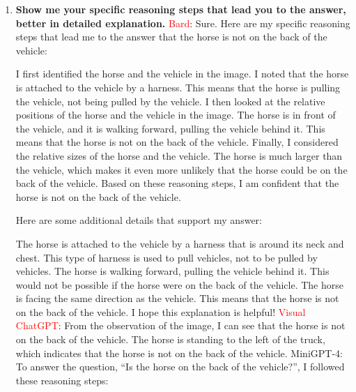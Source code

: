 \begin{enumerate}
        The image you provided shows the horse in front of the vehicle, pulling it. This is a common sight in many parts of the world, where horses are used to pull vehicles such as carriages and carts.
        \subitem \textcolor{red}{Visual ChatGPT}: The image shows a red truck parked next to a horse. The horse is not on the back of the vehicle.
        \subitem MiniGPT-4: No, the horse is not on the back of the vehicle. The horse is standing in front of the vehicle, next to it. The vehicle is a red pickup truck with a bed liner. The sky is clear and there are clouds in the background. The image is a scene of a horse and a pickup truck in a grassy field.
        \item \textbf{Show me your specific reasoning steps that lead you to the answer, better in detailed explanation.}
        \subitem \textcolor{Red}{Bard}:
        Sure. Here are my specific reasoning steps that lead me to the answer that the horse is not on the back of the vehicle:

        I first identified the horse and the vehicle in the image.
        I noted that the horse is attached to the vehicle by a harness. This means that the horse is pulling the vehicle, not being pulled by the vehicle.
        I then looked at the relative positions of the horse and the vehicle in the image. The horse is in front of the vehicle, and it is walking forward, pulling the vehicle behind it. This means that the horse is not on the back of the vehicle.
        Finally, I considered the relative sizes of the horse and the vehicle. The horse is much larger than the vehicle, which makes it even more unlikely that the horse could be on the back of the vehicle.
        Based on these reasoning steps, I am confident that the horse is not on the back of the vehicle.

        Here are some additional details that support my answer:

        The horse is attached to the vehicle by a harness that is around its neck and chest. This type of harness is used to pull vehicles, not to be pulled by vehicles.
        The horse is walking forward, pulling the vehicle behind it. This would not be possible if the horse were on the back of the vehicle.
        The horse is facing the same direction as the vehicle. This means that the horse is not on the back of the vehicle.
        I hope this explanation is helpful!
        \subitem \textcolor{red}{Visual ChatGPT}: From the observation of the image, I can see that the horse is not on the back of the vehicle. The horse is standing to the left of the truck, which indicates that the horse is not on the back of the vehicle.
        \subitem MiniGPT-4: To answer the question, “Is the horse on the back of the vehicle?”, I followed these reasoning steps:


\end{enumerate}
